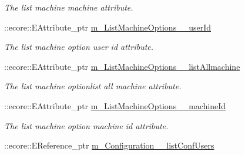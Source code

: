 \begin{DoxyCompactItemize}
\begin{DoxyCompactList}\small\item\em The list machine machine attribute. \item\end{DoxyCompactList}\item 
\hypertarget{classUMS__Data_1_1UMS__DataPackage_ac25fb9f7bcd1d51b2f063a5f7bd5a6ea}{
::ecore::EAttribute\_\-ptr \hyperlink{classUMS__Data_1_1UMS__DataPackage_ac25fb9f7bcd1d51b2f063a5f7bd5a6ea}{m\_\-ListMachineOptions\_\-\_\-userId}}
\label{classUMS__Data_1_1UMS__DataPackage_ac25fb9f7bcd1d51b2f063a5f7bd5a6ea}

\begin{DoxyCompactList}\small\item\em The list machine option user id attribute. \item\end{DoxyCompactList}\item 
\hypertarget{classUMS__Data_1_1UMS__DataPackage_a628a43cffafe1fb7dad71e5902e26b35}{
::ecore::EAttribute\_\-ptr \hyperlink{classUMS__Data_1_1UMS__DataPackage_a628a43cffafe1fb7dad71e5902e26b35}{m\_\-ListMachineOptions\_\-\_\-listAllmachine}}
\label{classUMS__Data_1_1UMS__DataPackage_a628a43cffafe1fb7dad71e5902e26b35}

\begin{DoxyCompactList}\small\item\em The list machine optionlist all machine attribute. \item\end{DoxyCompactList}\item 
\hypertarget{classUMS__Data_1_1UMS__DataPackage_a60ad7798fd15a1543630ba03a5429fe5}{
::ecore::EAttribute\_\-ptr \hyperlink{classUMS__Data_1_1UMS__DataPackage_a60ad7798fd15a1543630ba03a5429fe5}{m\_\-ListMachineOptions\_\-\_\-machineId}}
\label{classUMS__Data_1_1UMS__DataPackage_a60ad7798fd15a1543630ba03a5429fe5}

\begin{DoxyCompactList}\small\item\em The list machine option machine id attribute. \item\end{DoxyCompactList}\item 
\hypertarget{classUMS__Data_1_1UMS__DataPackage_a422c6a3b97bf4f034f7598d267edf3b5}{
::ecore::EReference\_\-ptr \hyperlink{classUMS__Data_1_1UMS__DataPackage_a422c6a3b97bf4f034f7598d267edf3b5}{m\_\-Configuration\_\-\_\-listConfUsers}}
\label{classUMS__Data_1_1UMS__DataPackage_a422c6a3b97bf4f034f7598d267edf3b5}


\end{DoxyCompactItemize}
